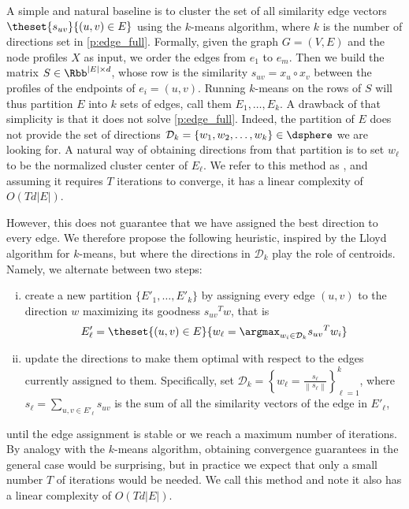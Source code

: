 A simple and natural baseline is to cluster the set of all similarity edge vectors $
\theset{s_{uv}}{(u,v) \in E}$ using the $k$-means algorithm, where $k$ is the number of directions
set in \autoref{p:edge_full}. Formally, given the graph $G=(V,E)$ and the node profiles $X$ as
input, we order the edges from $e_1$ to $e_m$. Then we build the matrix $S \in \Rbb^{|E|\times d}$, whose
\ith{} row is the similarity $s_{uv} = x_u \circ x_v$ between the profiles of the endpoints of $e_i=(u,v)$.
Running $k$-means on the rows of $S$ will thus partition $E$ into $k$ sets of edges, call them $E_1,
\ldots, E_k$. A drawback of that simplicity is that it does not solve \autoref{p:edge_full}.
Indeed, the partition of $E$ does not provide the set of directions $\mathcal{D}_k = \{w_1, w_2,
\ldots, w_k\} \in \dsphere$ we are looking for. A natural way of obtaining directions from that
partition is to set $w_\ell$ to be the normalized cluster center of $E_\ell$. We refer to this
method as \kmeans{}, and assuming it requires $T$ iterations to converge, it has a linear complexity
of $O(Td|E|)$.
\iffalse
\begin{center}
  \rule{\textwidth}{.3pt}
  \begin{algorithmic}[1]
    \Function{\kmeans{}}{graph $G=(V,E=\{e_1, \ldots, e_m \})$, profiles $X$}
    \State build the matrix $S$ such that $S_{i,j} = {s_{e_i}}_{;j}$
    \State let $\yhat{}$ and $\{c_1, \ldots, c_k\}$ be the assignment and centroids resulting of
    running $k$-means on the rows of $S$
    \State \textbf{return} \yhat{}, $\mathcal{D}_k = \left\{\frac{c_\ell}{\left\| c_\ell
    \right\|}\right\}_{\ell=1}^k $
    \EndFunction
  \end{algorithmic}
  \rule{\textwidth}{.3pt}
\end{center}
\fi

However,
this does not guarantee that we have assigned the best direction to every edge. We therefore propose
the following heuristic, inspired by the Lloyd algorithm for $k$-means, but where the directions in
$\mathcal{D}_k$ play the role of centroids. Namely, we alternate between two steps:
\begin{enumerate}[(i), nosep]
  \item create a new partition $\{E'_1, \ldots, E'_k\}$ by assigning every edge $(u,v)$ to the
    direction $w$ maximizing its goodness ${s_{uv}}^T w$, that is \[E'_\ell = \theset{(u,v) \in E}{
    w_\ell = \argmax_{w_i \in \mathcal{D}_k} {s_{uv}}^T w_i}\]
  \item update the directions to make them optimal with respect to the edges currently assigned to
    them. Specifically, set $\mathcal{D}_k = \left\{ w_\ell = \frac{s_\ell}{\left\| s_\ell
    \right\|}\right\}_{\ell=1}^k $, where $s_\ell = \sum_{u,v \in E'_\ell} s_{uv}$ is the sum of all
    the similarity vectors of the edge in $E'_\ell$,
\end{enumerate}
until the edge assignment is stable or we reach a maximum number of iterations. By analogy with the
$k$-means algorithm, obtaining convergence guarantees in the general case would be surprising, but in
practice we expect that only a small number $T$ of iterations would be needed. We call this method
\lloyd{} and note it also has a linear complexity of $O(Td|E|)$.


